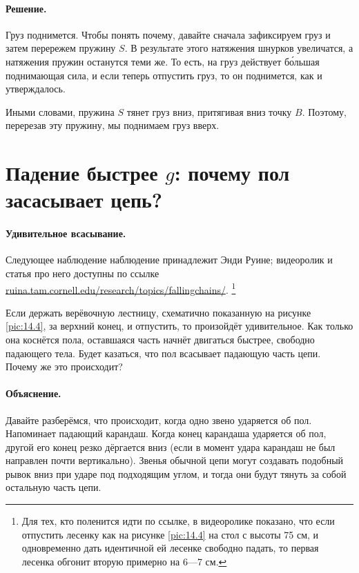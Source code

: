 \paragraph{Решение.}
Груз поднимется.
Чтобы понять почему, давайте сначала зафиксируем груз и затем перережем пружину $S$.
В результате этого натяжения шнурков увеличатся, а натяжения пружин останутся теми же.
То есть, на груз действует б\'{о}льшая поднимающая сила, и если теперь отпустить груз, то он поднимется, как и утверждалось.

Иными словами, пружина $S$ тянет груз вниз, притягивая вниз точку $B$.
Поэтому, перерезав эту пружину, мы поднимаем груз вверх.

\section{Падение быстрее $g$: почему пол засасывает цепь?}

\paragraph{Удивительное всасывание.}
Следующее наблюдение наблюдение принадлежит Энди Руине;
видеоролик и статья про него доступны по ссылке
\href{http://ruina.tam.cornell.edu/research/topics/fallingchains/}{ruina.tam.cornell.edu/research/topics/fallingchains/}.%
\footnote{Для тех, кто поленится идти по ссылке, в видеоролике показано, что если отпустить лесенку как на рисунке \ref{pic:14.4} на стол с высоты 75 см, и одновременно дать идентичной ей лесенке свободно падать, то первая лесенка обгонит вторую примерно на 6---7 см.\pr}

Если держать верёвочную лестницу, схематично показанную на рисунке \ref{pic:14.4}, за верхний конец, и отпустить, то произойдёт удивительное.
Как только она коснётся пола, оставшаяся часть начнёт двигаться быстрее, свободно падающего тела.
Будет казаться, что пол всасывает падающую часть цепи.
Почему же это происходит?

\paragraph{Объяснение.}
Давайте разберёмся, что происходит, когда одно звено ударяется об пол.
Напоминает падающий карандаш.
Когда конец карандаша ударяется об пол, другой его конец резко дёргается вниз (если в момент удара  карандаш не был направлен почти вертикально).
Звенья обычной цепи могут создавать подобный рывок вниз при ударе под подходящим углом, и тогда они будут тянуть за собой остальную часть цепи.


